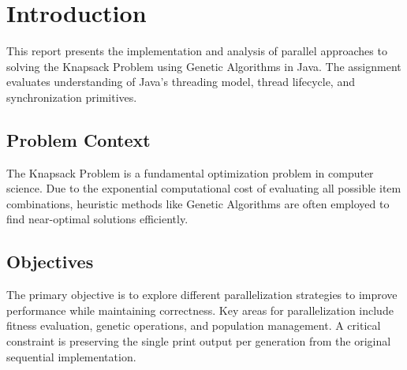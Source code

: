 \chapter{Introduction} \label{cap:intro}

This report presents the implementation and analysis of parallel approaches to
solving the Knapsack Problem using Genetic Algorithms in Java. The assignment
evaluates understanding of Java's threading model, thread lifecycle, and
synchronization primitives.

\section{Problem Context}

The Knapsack Problem is a fundamental optimization problem in computer science.
Due to the exponential computational cost of evaluating all possible item
combinations, heuristic methods like Genetic Algorithms are often employed to
find near-optimal solutions efficiently.

\section{Objectives}

The primary objective is to explore different parallelization strategies to
improve performance while maintaining correctness. Key areas for parallelization
include fitness evaluation, genetic operations, and population management. A
critical constraint is preserving the single print output per generation from
the original sequential implementation.